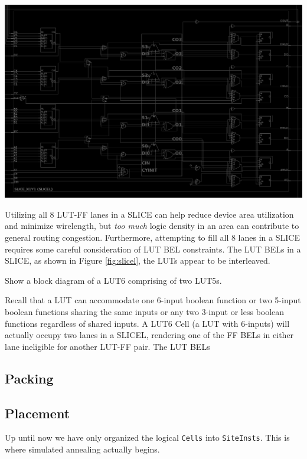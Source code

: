 \documentclass{article}
\begin{document}
\begin{multicols}{2}
        {
            \centering
            \includegraphics[width=\columnwidth]{figures/slicel.png}
            \label{fig:slicel}
        }


        Utilizing all 8 LUT-FF lanes in a SLICE can help reduce device area utilization and minimize wirelength, but \emph{too much} logic density in an area can contribute to general routing congestion. 
        Furthermore, attempting to fill all 8 lanes in a SLICE requires some careful consideration of LUT BEL constraints. 
        The LUT BELs in a SLICE, as shown in Figure \ref{fig:slicel}, the LUTs appear to be interleaved. 


        Show a block diagram of a LUT6 comprising of two LUT5s.


        Recall that a LUT can accommodate one 6-input boolean function or two 5-input boolean functions sharing the same inputs or any two 3-input or less boolean functions regardless of shared inputs. 
        A LUT6 Cell (a LUT with 6-inputs) will actually occupy two lanes in a SLICEL, rendering one of the FF BELs in either lane ineligible for another LUT-FF pair. 
        The LUT BELs
        
    \subsection{Packing}
        \label{subsec:packing}

    \subsection{Placement}
        \label{subsec:placement}
        Up until now we have only organized the logical \texttt{Cells} into \texttt{SiteInsts}. 
        This is where simulated annealing actually begins. 




\end{multicols}
\end{document}
